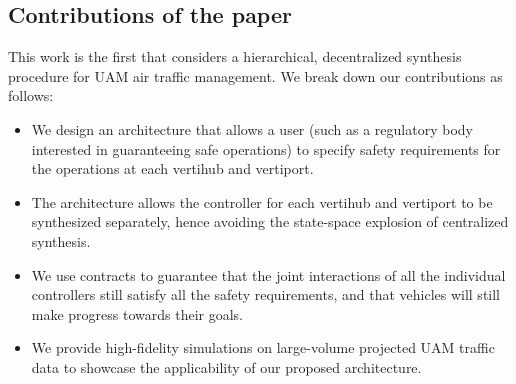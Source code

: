  
\subsection{Contributions of the paper}
This work is the first that considers a hierarchical, decentralized synthesis procedure for UAM air traffic management. We break down our contributions as follows: 



\begin{itemize}
    \item We design an architecture that allows a user (such as a regulatory body interested in guaranteeing safe operations) to specify safety requirements for the operations at each vertihub and vertiport. 
    \item The architecture allows the controller for each vertihub and vertiport to be synthesized separately, hence avoiding the state-space explosion of centralized synthesis. 
    \item We use contracts to guarantee that the joint interactions of all the individual controllers still satisfy all the safety requirements, and that vehicles will still make progress towards their goals. 
    \item We provide high-fidelity simulations on large-volume projected UAM traffic data to showcase the applicability of our proposed architecture.
\end{itemize}
